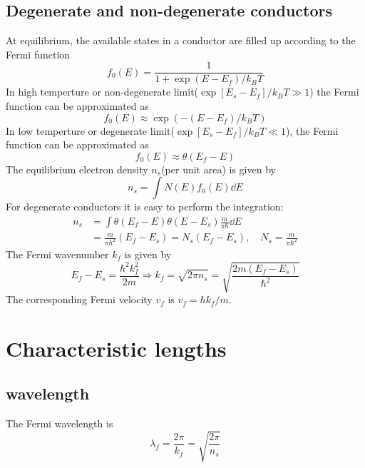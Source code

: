 \documentclass[11pt,a4paper]{book}
\theoremstyle{plain}
\theoremstyle{definition}
\theoremstyle{remark}
\begin{document}
\subsection{Degenerate and non-degenerate conductors}
At equilibrium, the available states in a conductor are filled up according to the Fermi function
\begin{equation}
    f_0(E) = \frac{1}{1 + \exp(E - E_f)/k_B T}
\end{equation}
In high temperture or non-degenerate limit($\exp[E_s-E_f]/k_B T \gg 1$) the Fermi function can be approximated as
\begin{equation}
    f_0(E) \approx \exp(-(E - E_f)/k_B T)
\end{equation}
In low temperture or degenerate limit($\exp[E_s-E_f]/k_B T \ll 1$), the Fermi function can be approximated as
\begin{equation}
    f_0(E) \approx \theta(E_f - E)
\end{equation}
The equilibrium electron density $n_s$(per unit area) is given by
\begin{equation}
    n_s = \int N(E) f_0(E) \dd E
\end{equation}
For degenerate conductors it is easy to perform the integration:
\begin{equation}
    \begin{aligned}
        n_s &= \int \theta(E_f-E) \theta(E-E_s) \frac{m}{\pi \hbar} \dd E \\
        & = \frac{m}{\pi \hbar^2} (E_f - E_s) = N_s(E_f-E_s), \quad N_s = \frac{m}{\pi \hbar^2}
    \end{aligned}
\end{equation}
The Fermi wavenumber $k_f$ is given by
\begin{equation}
    E_f-E_s = \frac{\hbar^2 k_f^2}{2 m} \Rightarrow k_f = \sqrt{2 \pi n_s} = \sqrt{\frac{2 m (E_f - E_s)}{\hbar^2}}
\end{equation}
The corresponding Fermi velocity $v_f$ is $v_f=\hbar k_f/m$.
\section{Characteristic lengths}
\subsection{wavelength}
The Fermi wavelength is
\begin{equation}
    \lambda_f = \frac{2 \pi}{k_f} = \sqrt{\frac{2 \pi}{n_s}}
\end{equation}
\end{document}
